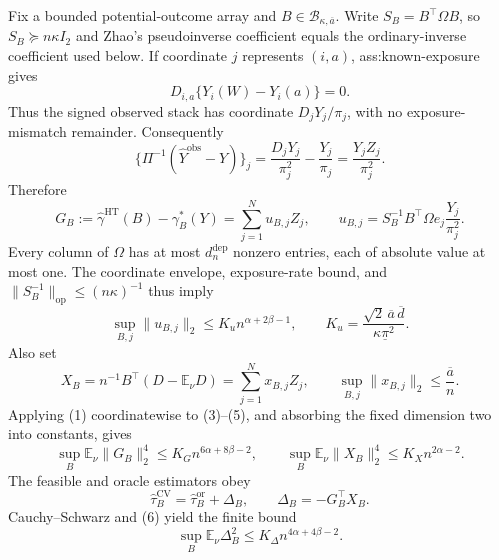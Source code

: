 Fix a bounded potential-outcome array and \(B\in\mathcal B_{\kappa,\overline a}\).  Write \(S_B=B^\top\Omega B\), so \(S_B\succeq n\kappa I_2\) and Zhao's pseudoinverse coefficient equals the ordinary-inverse coefficient used below.  If coordinate \(j\) represents \((i,a)\), ass:known-exposure gives
\[
D_{i,a}\{Y_i(W)-Y_i(a)\}=0.
\]
Thus the signed observed stack has coordinate \(D_jY_j/\pi_j\), with no exposure-mismatch remainder.  Consequently
\[
 \{\Pi^{-1}(\widehat Y^{\mathrm{obs}}-Y)\}_j
 =\frac{D_jY_j}{\pi_j^2}-\frac{Y_j}{\pi_j}
 =\frac{Y_jZ_j}{\pi_j^2}.
\]
Therefore
\[
 G_B:=\widehat\gamma^{\mathrm{HT}}(B)-\gamma_B^*(Y)
 =\sum_{j=1}^{N}u_{B,j}Z_j,
 \qquad
 u_{B,j}=S_B^{-1}B^\top\Omega e_j\frac{Y_j}{\pi_j^2}.
 \tag{3}
\]
Every column of \(\Omega\) has at most \(d_n^{\mathrm{dep}}\) nonzero entries, each of absolute value at most one.  The coordinate envelope, exposure-rate bound, and \(\lVert S_B^{-1}\rVert_{\mathrm{op}}\leq(n\kappa)^{-1}\) thus imply
\[
 \sup_{B,j}\lVert u_{B,j}\rVert_2
 \leq K_u n^{\alpha+2\beta-1},
 \qquad
 K_u=\frac{\sqrt2\,\overline a\,\overline d}{\kappa\underline\pi^2}.
 \tag{4}
\]
Also set
\[
 X_B=n^{-1}B^\top(D-\mathbb E_\nu D)
 =\sum_{j=1}^{N}x_{B,j}Z_j,
 \qquad
 \sup_{B,j}\lVert x_{B,j}\rVert_2\leq\frac{\overline a}{n}.
 \tag{5}
\]
Applying (1) coordinatewise to (3)--(5), and absorbing the fixed dimension two into constants, gives
\[
 \sup_B\mathbb E_\nu\lVert G_B\rVert_2^4
 \leq K_G n^{6\alpha+8\beta-2},
 \qquad
 \sup_B\mathbb E_\nu\lVert X_B\rVert_2^4
 \leq K_X n^{2\alpha-2}.
 \tag{6}
\]
The feasible and oracle estimators obey
\[
 \widehat\tau_B^{\mathrm{CV}}
 =\widehat\tau_B^{\mathrm{or}}+\Delta_B,
 \qquad
 \Delta_B=-G_B^\top X_B.
 \tag{7}
\]
Cauchy--Schwarz and (6) yield the finite bound
\[
 \sup_B\mathbb E_\nu\Delta_B^2
 \leq K_\Delta n^{4\alpha+4\beta-2}.
 \tag{8}
\]

